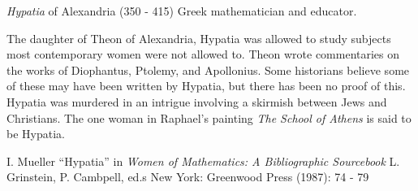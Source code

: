 \documentclass[12pt]{article}
\begin{document}
\emph{Hypatia} of Alexandria (350 - 415) Greek mathematician and educator.

The daughter of Theon of Alexandria, Hypatia was allowed to study subjects most contemporary women were not allowed to. Theon wrote commentaries on the works of Diophantus, Ptolemy, and Apollonius. Some historians believe some of these may have been written by Hypatia, but there has been no proof of this. Hypatia was murdered in an intrigue involving a skirmish between Jews and Christians. The one woman in Raphael's painting {\it The School of Athens} is said to be Hypatia.

\begin{thebibliography}{1}
 I. Mueller ``Hypatia'' in {\it Women of Mathematics: A Bibliographic Sourcebook} L. Grinstein, P. Cambpell, ed.s New York: Greenwood Press (1987): 74 - 79
\end{thebibliography}
\end{document}
